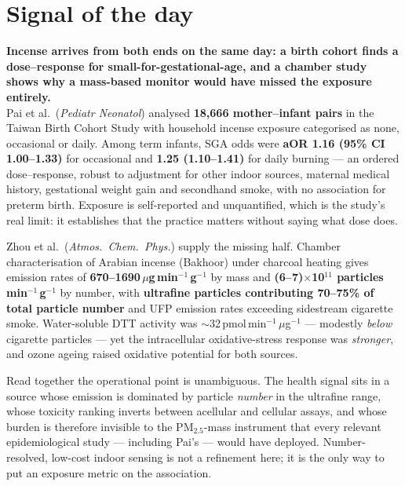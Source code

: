 \documentclass[10pt]{article}
\begin{document}
\vspace{6mm}

\section*{\sffamily\bfseries\color{Deep}Signal of the day}
\vspace{-1.5mm}{\color{Amber}\rule{\linewidth}{1.1pt}}\vspace{2.5mm}

\begin{keybox}
{\sffamily\bfseries\small\color{Deep}Incense arrives from both ends on the same day: a
birth cohort finds a dose--response for small-for-gestational-age, and a chamber study
shows why a mass-based monitor would have missed the exposure entirely.}\\[1.4mm]
\footnotesize
Pai et al.\ (\textit{Pediatr Neonatol}) analysed \textbf{18{,}666 mother--infant pairs}
in the Taiwan Birth Cohort Study with household incense exposure categorised as none,
occasional or daily. Among term infants, SGA odds were \textbf{aOR 1.16 (95\% CI
1.00--1.33)} for occasional and \textbf{1.25 (1.10--1.41)} for daily burning --- an
ordered dose--response, robust to adjustment for other indoor sources, maternal medical
history, gestational weight gain and secondhand smoke, with no association for preterm
birth. Exposure is self-reported and unquantified, which is the study's real limit: it
establishes that the practice matters without saying what dose does.

Zhou et al.\ (\textit{Atmos.\ Chem.\ Phys.}) supply the missing half. Chamber
characterisation of Arabian incense (Bakhoor) under charcoal heating gives emission rates
of \textbf{670--1690\,$\mu$g\,min$^{-1}$\,g$^{-1}$} by mass and
\textbf{(6--7)$\times$10$^{11}$ particles\,min$^{-1}$\,g$^{-1}$} by number, with
\textbf{ultrafine particles contributing 70--75\% of total particle number} and UFP
emission rates exceeding sidestream cigarette smoke. Water-soluble DTT activity was
$\sim$32\,pmol\,min$^{-1}$\,$\mu$g$^{-1}$ --- modestly \emph{below} cigarette particles ---
yet the intracellular oxidative-stress response was \emph{stronger}, and ozone ageing
raised oxidative potential for both sources.

Read together the operational point is unambiguous. The health signal sits in a source
whose emission is dominated by particle \emph{number} in the ultrafine range, whose
toxicity ranking inverts between acellular and cellular assays, and whose burden is
therefore invisible to the PM$_{2.5}$-mass instrument that every relevant epidemiological
study --- including Pai's --- would have deployed. Number-resolved, low-cost indoor
sensing is not a refinement here; it is the only way to put an exposure metric on the
association.
\end{keybox}
\end{document}
